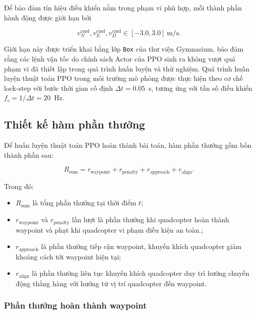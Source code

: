 Để bảo đảm tín hiệu điều khiển nằm trong phạm vi phù hợp, mỗi thành phần hành động được giới hạn bởi

\begin{equation}
    v_N^{\mathrm{cmd}}, v_E^{\mathrm{cmd}}, v_D^{\mathrm{cmd}} \in [-3.0, 3.0]~\mathrm{m/s}.
    \label{eq:action-bound}
\end{equation}

Giới hạn này được triển khai bằng lớp \texttt{Box} của thư viện Gymnasium, bảo đảm rằng các lệnh vận tốc do chính sách Actor của PPO sinh ra không vượt quá phạm vi đã thiết lập trong quá trình huấn luyện và thử nghiệm. Quá trình huấn luyện thuật toán PPO trong môi trường mô phỏng được thực hiện theo cơ chế lock-step với bước thời gian cố định $\Delta t = 0.05$~s, tương ứng với tần số điều khiển $f_c = 1/\Delta t = 20$~Hz.

\subsection{Thiết kế hàm phần thưởng}

Để huấn luyện thuật toán PPO hoàn thành bài toán, hàm phần thưởng gồm bốn thành phần sau:

\begin{equation}
    R_{\mathrm{sum}} = r_{\mathrm{waypoint}} + r_{\mathrm{penalty}} + r_{\mathrm{approach}} + r_{\mathrm{align}}.
    \label{eq:total-reward}
\end{equation}

Trong đó:

\begin{itemize}
    \item $R_{\mathrm{sum}}$ là tổng phần thưởng tại thời điểm $t$;
    \item $r_{\mathrm{waypoint}}$ và $r_{\mathrm{penalty}}$ lần lượt là phần thưởng khi quadcopter hoàn thành waypoint và phạt khi quadcopter vi phạm điều kiện an toàn.;
    \item $r_{\mathrm{approach}}$ là phần thưởng tiếp cận waypoint, khuyến khích quadcopter giảm khoảng cách tới waypoint hiện tại;
    \item $r_{\mathrm{align}}$ là phần thưởng liên tục khuyến khích quadcopter duy trì hướng chuyển động thẳng hàng với hướng từ vị trí quadcopter đến waypoint.
\end{itemize}

\subsubsection{Phần thưởng hoàn thành waypoint}


